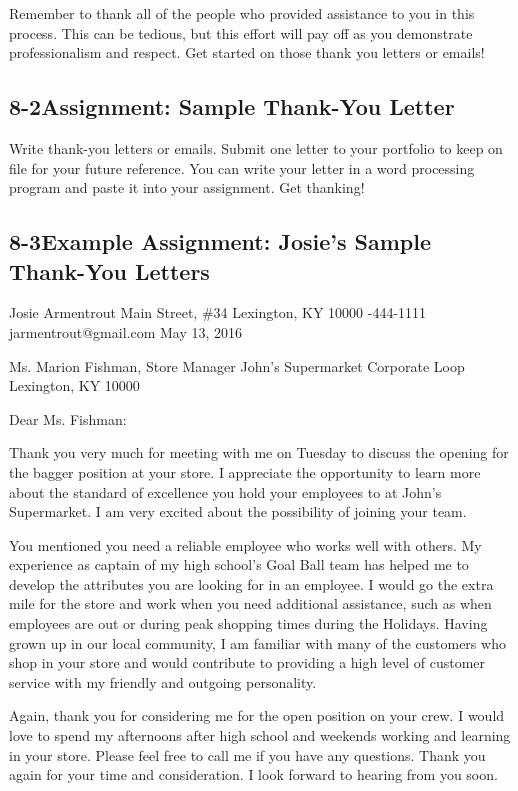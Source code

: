 Remember to thank all of the people who provided assistance to you in this process. This can be tedious, but this effort will pay off as you demonstrate professionalism and respect. Get started on those thank you letters or emails!

\pagebreak \subsection*{8-2\quad Assignment: Sample Thank-You Letter}
Write thank-you letters or emails. Submit one letter to your portfolio to keep on file for your future reference. You can write your letter in a word processing program and paste it into your assignment. Get thanking!

\pagebreak \subsection*{8-3\quad Example Assignment: Josie's Sample Thank-You Letters}
Josie Armentrout
 Main Street, \#34
\break Lexington, KY 10000
-444-1111
\break jarmentrout@gmail.com
\break May 13, 2016

Ms. Marion Fishman,
\break Store Manager
\break John's Supermarket
 Corporate Loop
\break Lexington, KY 10000

Dear Ms. Fishman:

Thank you very much for meeting with me on Tuesday to discuss the opening for the bagger position at your store. I appreciate the opportunity to learn more about the standard of excellence you hold your employees to at John's Supermarket. I am very excited about the possibility of joining your team.

You mentioned you need a reliable employee who works well with others. My experience as captain of my high school's Goal Ball team has helped me to develop the attributes you are looking for in an employee. I would go the extra mile for the store and work when you need additional assistance, such as when employees are out or during peak shopping times during the Holidays. Having grown up in our local community, I am familiar with many of the customers who shop in your store and would contribute to providing a high level of customer service with my friendly and outgoing personality.

Again, thank you for considering me for the open position on your crew. I would love to spend my afternoons after high school and weekends working and learning in your store. Please feel free to call me if you have any questions. Thank you again for your time and consideration. I look forward to hearing from you soon.

